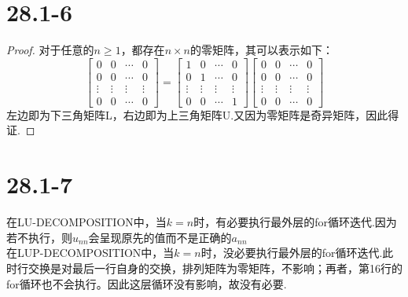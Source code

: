 \documentclass[twocolumn]{article}
\newenvironment{SChinese}{%
	\CJKfamily{gbsn}%
	\CJKtilde
	\CJKnospace}{}
\begin{document}
\begin{CJK}{UTF8}{}
\begin{SChinese}
			\section*{28.1-6}
				\begin{proof}
					对于任意的$n\ge1$，都存在$n\times n$的零矩阵，其可以表示如下：
					\begin{displaymath}
						\left [\begin{matrix}
						0 & 0 & \cdots & 0 \\
						0 & 0 & \cdots & 0 \\
						\vdots & \vdots & \vdots & \vdots \\
						0 & 0 & \cdots & 0  
						\end{matrix}\right] = \left [\begin{matrix}
						1 & 0 & \cdots & 0 \\
						0 & 1 & \cdots & 0 \\
						\vdots & \vdots & \vdots & \vdots \\
						0 & 0 & \cdots & 1  
						\end{matrix}\right] \left [\begin{matrix}
						0 & 0 & \cdots & 0 \\
						0 & 0 & \cdots & 0 \\
						\vdots & \vdots & \vdots & \vdots \\
						0 & 0 & \cdots & 0   
						\end{matrix}\right]
					\end{displaymath}
					左边即为下三角矩阵L，右边即为上三角矩阵U.又因为零矩阵是奇异矩阵，因此得证.
				\end{proof}
			\section*{28.1-7}
				在LU-DECOMPOSITION中，当$k=n$时，有必要执行最外层的for循环迭代.因为若不执行，则$u_{nn}$会呈现原先的值而不是正确的$a_{nn}$\\
				在LUP-DECOMPOSITION中，当$k=n$时，没必要执行最外层的for循环迭代.此时行交换是对最后一行自身的交换，排列矩阵为零矩阵，不影响；再者，第16行的for循环也不会执行。因此这层循环没有影响，故没有必要.

\end{SChinese}
\end{CJK}
\end{document}
